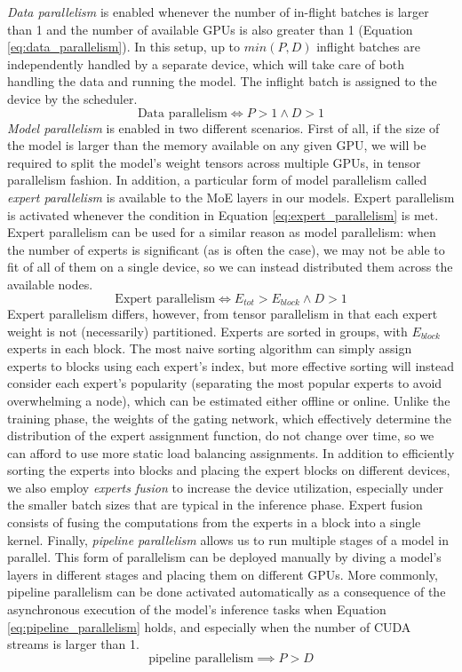 \textit{Data parallelism} is enabled whenever the number of in-flight batches is larger than 1 and the number of available GPUs is also greater than 1 (Equation \ref{eq:data_parallelism}). In this setup, up to $min(P, D)$ inflight batches are independently handled by a separate device, which will take care of both handling the data and running the model. The inflight batch is assigned to the device by the scheduler. 
\begin{equation}\label{eq:data_parallelism}
    \text{Data parallelism} \iff P > 1  \wedge D > 1
\end{equation}
\textit{Model parallelism} is enabled in two different scenarios. First of all, if the size of the model is larger than the memory available on any given GPU, we will be required to split the model's weight tensors across multiple GPUs, in tensor parallelism fashion. In addition, a particular form of model parallelism called \textit{expert parallelism} is available to the MoE layers in our models. Expert parallelism is activated whenever the condition in Equation \ref{eq:expert_parallelism} is met. Expert parallelism can be used for a similar reason as model parallelism: when the number of experts is significant (as is often the case), we may not be able to fit of all of them on a single device, so we can instead distributed them across the available nodes.
\begin{equation}\label{eq:expert_parallelism}
    \text{Expert parallelism} \iff E_{tot} > E_{block} \wedge D > 1
\end{equation}
Expert parallelism differs, however, from tensor parallelism in that each expert weight is not (necessarily) partitioned. Experts are sorted in groups, with $E_{block}$ experts in each block. The most naive sorting algorithm can simply assign experts to blocks using each expert's index, but more effective sorting will instead consider each expert's popularity (separating the most popular experts to avoid overwhelming a node), which can be estimated either offline or online. Unlike the training phase, the weights of the gating network, which effectively determine the distribution of the expert assignment function, do not change over time, so we can afford to use more static load balancing assignments. 
In addition to efficiently sorting the experts into blocks and placing the expert blocks on different devices, we also employ \textit{experts fusion} to increase the device utilization, especially under the smaller batch sizes that are typical in the inference phase. Expert fusion consists of fusing the computations from the experts in a block into a single kernel.
Finally, \textit{pipeline parallelism} allows us to run multiple stages of a model in parallel. This form of parallelism can be deployed manually by diving a model's layers in different stages and placing them on different GPUs. More commonly, pipeline parallelism can be done activated automatically as a consequence of the asynchronous execution of the model's inference tasks when Equation \ref{eq:pipeline_parallelism} holds, and especially when the number of CUDA streams is larger than 1.
\begin{equation}\label{eq:pipeline_parallelism}
    \text{pipeline parallelism} \implies P > D
\end{equation}


